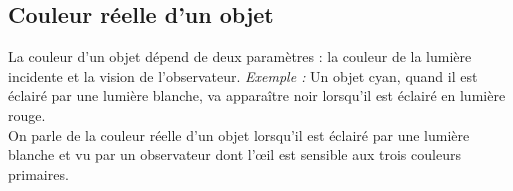 \documentclass[a4paper,11pt,fleqn]{article}%
\begin{document}
    \subsection{Couleur réelle d'un objet}
    La couleur d'un objet dépend de deux paramètres : la couleur de la lumière incidente et la vision de l'observateur.
    \textit{Exemple :} Un objet cyan, quand il est éclairé par une lumière blanche, va apparaître noir lorsqu'il est éclairé en lumière rouge.\\
    On parle de la couleur réelle d'un objet lorsqu'il est éclairé par une lumière blanche et vu par un observateur dont l'\oe il est sensible aux trois couleurs primaires.
\end{document}
